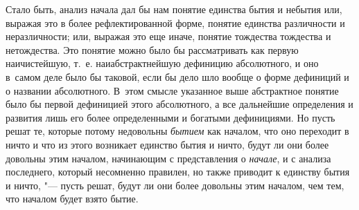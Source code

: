 Стало быть, анализ начала дал бы нам понятие единства бытия и небытия или,
выражая это в более рефлектированной форме, понятие единства различности и
неразличности; или, выражая это еще иначе, понятие тождества тождества и
нетождества. Это понятие можно было бы рассматривать
как первую наичистейшую, т.~е. наиабстрактнейшую дефиницию абсолютного, и оно
в~самом деле было бы таковой, если бы дело шло вообще о форме дефиниций и о
названии абсолютного. В~этом смысле указанное выше абстрактное понятие было бы
первой дефиницией этого абсолютного, а все дальнейшие определения и развития
лишь его более определенными и богатыми дефинициями. Но пусть решат те, которые
потому недовольны {\em бытием} как началом, что оно переходит в ничто и что из
этого возникает единство бытия и ничто, будут ли они более довольны этим
началом, начинающим с представления о {\em начале}, и с анализа последнего,
который несомненно правилен, но также приводит к единству бытия и ничто, "---
пусть решат, будут ли они более довольны этим началом, чем тем, что началом
будет взято бытие.

